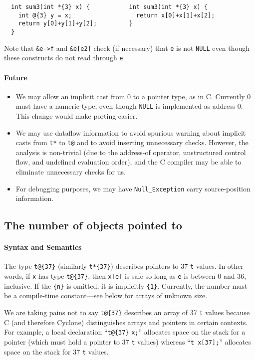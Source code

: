 \begin{verbatim}
  int sum3(int *{3} x) {           int sum3(int *{3} x) {
    int @{3} y = x;                  return x[0]+x[1]+x[2];
    return y[0]+y[1]+y[2];         }
  }
\end{verbatim}


Note that \texttt{\&e->f} and \texttt{\&e[e2]} check (if necessary) that
\texttt{e} is not \texttt{NULL} even though these constructs do not read
through \texttt{e}.

\paragraph{Future}

\begin{itemize}
\item We may allow an implicit cast from 0 to a pointer type, as in
  C\@.  Currently 0 must have a numeric type, even though \texttt{NULL}
  is implemented as address 0.  This change would make porting easier.
\item We may use dataflow information to avoid spurious warning about
  implicit casts from \texttt{t*} to \texttt{t@} and to avoid
  inserting unnecessary checks.  However, the analysis is
  non-trivial (due to the address-of operator, unstructured control
  flow, and undefined evaluation order), and the C compiler may be
  able to eliminate unnecessary checks for us.
\item For debugging purposes, we may have \texttt{Null_Exception}
  carry source-position information.
\end{itemize}

\subsection*{\hypertarget{pointer_bound}{The number of objects pointed to}}

\paragraph{Syntax and Semantics}
The type \verb|t@{37}| (similarly \verb|t*{37}|) describes pointers to
37 \texttt{t} values.  In other words, if \texttt{x} has type
\verb|t@{37}|, then \texttt{x[e]} is safe so long as \texttt{e} is between
0 and 36, inclusive.  If the \verb|{n}| is omitted, it is implicitly
\verb|{1}|.  Currently, the number must be a compile-time
constant---see below for arrays of unknown size.

We are taking pains not to say \verb|t@{37}| describes an array of 37
\texttt{t} values because C (and therefore Cyclone) distinguishes arrays
and pointers in certain contexts.  For example, a local declaration
``\verb|t@{37}| \texttt{x;}'' allocates space on the stack for a pointer
(which must hold a pointer to 37 \texttt{t} values) whereas
``\texttt{t x[37];}'' allocates space on the stack for 37 \texttt{t}
values.



